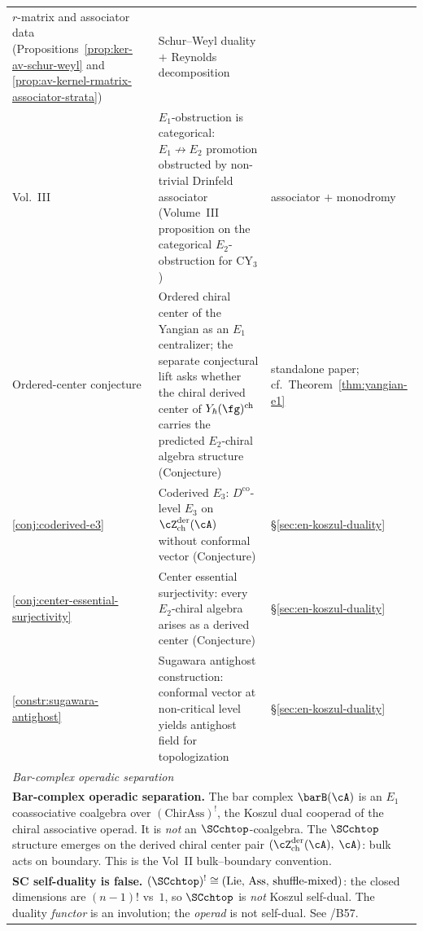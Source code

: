 \begin{center}
\begin{tabular}{lp{8cm}l}
 $r$-matrix and associator data
 \textup{(}Propositions~\ref{prop:ker-av-schur-weyl} and
 \ref{prop:av-kernel-rmatrix-associator-strata}\textup{)}
 & Schur--Weyl duality $+$ Reynolds decomposition \\
Vol.~III
 & $E_1$-obstruction is categorical:
 $E_1 \not\to E_2$ promotion obstructed by
 non-trivial Drinfeld associator
 \textup{(}Volume~III proposition on the categorical $E_2$-obstruction for CY$_3$\textup{)}
 & associator $+$ monodromy \\
Ordered-center conjecture
 & Ordered chiral center of the Yangian as an $E_1$ centralizer;
 the separate conjectural lift asks whether the chiral derived
 center of $Y_\hbar(\fg)^{\mathrm{ch}}$ carries the predicted
 $E_2$-chiral algebra structure
 \textup{(}Conjecture\textup{)}
 & standalone paper; cf.\ Theorem~\ref{thm:yangian-e1} \\
\ref{conj:coderived-e3}
 & Coderived $E_3$: $D^{\mathrm{co}}$-level $E_3$ on
 $\cZ^{\mathrm{der}}_{\mathrm{ch}}(\cA)$
 without conformal vector \textup{(}Conjecture\textup{)}
 & \S\ref{sec:en-koszul-duality} \\
\ref{conj:center-essential-surjectivity}
 & Center essential surjectivity:
 every $E_2$-chiral algebra arises as a derived center
 \textup{(}Conjecture\textup{)}
 & \S\ref{sec:en-koszul-duality} \\
\ref{constr:sugawara-antighost}
 & Sugawara antighost construction:
 conformal vector at non-critical level yields
 antighost field for topologization
 & \S\ref{sec:en-koszul-duality} \\
\hline
\multicolumn{3}{l}{\textit{Bar-complex operadic separation}} \\
\hline
\multicolumn{3}{p{13cm}}{%
 \textbf{Bar-complex operadic separation.}
 The bar complex $\barB(\cA)$ is an $E_1$ coassociative
 coalgebra over $(\mathrm{ChirAss})^!$, the Koszul dual
 cooperad of the chiral associative operad.
 It is \emph{not} an $\SCchtop$-coalgebra.
 The $\SCchtop$ structure emerges on the derived chiral
 center pair
 $(\cZ^{\mathrm{der}}_{\mathrm{ch}}(\cA),\; \cA)$:
 bulk acts on boundary.
	 This is the Vol~II bulk--boundary convention.} \\
\hline
\multicolumn{3}{p{13cm}}{%
 \textbf{SC self-duality is false.}
 $(\SCchtop)^! \cong (\mathrm{Lie},\, \mathrm{Ass},\,
 \text{shuffle-mixed})$: the closed dimensions are
 $(n{-}1)!$ vs~$1$, so $\SCchtop$ is \emph{not}
 Koszul self-dual. The duality \emph{functor} is an
 involution; the \emph{operad} is not self-dual.
 See /B57.} \\

\end{tabular}
\end{center}
